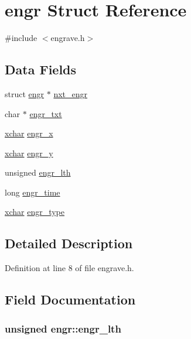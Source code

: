 \hypertarget{structengr}{\section{engr Struct Reference}
\label{structengr}
}


{\ttfamily \#include $<$engrave.\+h$>$}

\subsection*{Data Fields}
\begin{DoxyCompactItemize}
\item 
struct \hyperlink{structengr}{engr} $\ast$ \hyperlink{structengr_a95826e1e303870061e04cc8a81d34662}{nxt\+\_\+engr}
\item 
char $\ast$ \hyperlink{structengr_a95db64d2b9fd73b172acb8e5c6144d8f}{engr\+\_\+txt}
\item 
\hyperlink{global_8h_a2043b7d01ce89f4ee2fa6c345a752d32}{xchar} \hyperlink{structengr_a5a1194317671c2bfc8f39aa959c14bf3}{engr\+\_\+x}
\item 
\hyperlink{global_8h_a2043b7d01ce89f4ee2fa6c345a752d32}{xchar} \hyperlink{structengr_ac488abc6179daa205c494a8d629f6d35}{engr\+\_\+y}
\item 
unsigned \hyperlink{structengr_af991f3cff0acdb5966d958a51de4d022}{engr\+\_\+lth}
\item 
long \hyperlink{structengr_a24a00a252c90a7d237647e9c27567343}{engr\+\_\+time}
\item 
\hyperlink{global_8h_a2043b7d01ce89f4ee2fa6c345a752d32}{xchar} \hyperlink{structengr_ab1fa44428e7ffd9afd521ade75da2f51}{engr\+\_\+type}
\end{DoxyCompactItemize}


\subsection{Detailed Description}


Definition at line 8 of file engrave.\+h.



\subsection{Field Documentation}
\hypertarget{structengr_af991f3cff0acdb5966d958a51de4d022}{
\subsubsection[{engr\+\_\+lth}]{\setlength{\rightskip}{0pt plus 5cm}unsigned engr\+::engr\+\_\+lth}}\label{structengr_af991f3cff0acdb5966d958a51de4d022}


